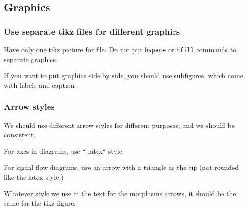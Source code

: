 \subsection{Graphics}

\subsubsection*{Use separate tikz files for different graphics}

Have only one tikz picture for file.
Do not put \texttt{hspace} or \texttt{hfill} commands to separate graphics.

If you want to put graphics side by side, you should use subfigures, which come with labels and caption.

\subsubsection*{Arrow styles}

We should use different arrow styles for different purposes,
and we should be consistent.

For axes in diagrams, use ``-latex`` style.

For signal flow diagrams, use an arrow with a triangle as the tip (not rounded like the latex style.)

Whatever style we use in the text for the morphisms arrows, it should be the same for the tikz figure.

